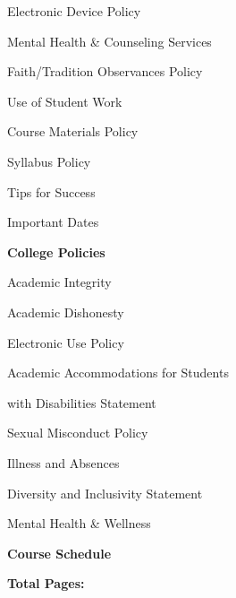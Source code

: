 \documentclass[11pt,letterpaper]{article}
\begin{document}
\begin{minipage}[t]{0.45\textwidth}
\hspace{0.3cm} Electronic Device Policy \dotfill \pageref{electronic} 
%
\end{minipage}\hfill\begin{minipage}[t]{0.45\textwidth} \par
\hspace{0.3cm} Mental Health \& Counseling Services \dotfill \pageref{mental_health} \par
\hspace{0.3cm} Faith/Tradition Observances Policy \dotfill \pageref{faith} \par
\hspace{0.3cm} Use of Student Work \dotfill \pageref{std_work} \par
\hspace{0.3cm} Course Materials Policy \dotfill \pageref{copyright} \par
\hspace{0.3cm} Syllabus Policy \dotfill \pageref{syllabus} \par
\hspace{0.3cm} Tips for Success \dotfill \pageref{tips} \par
\hspace{0.3cm} Important Dates \dotfill \pageref{imp_dates} \par
{\bfseries\color{stacred} College Policies} \dotfill \pageref{college_polc} \par
\hspace{0.3cm} Academic Integrity \dotfill \pageref{college_acadint} \par
\hspace{0.3cm} Academic Dishonesty \dotfill \pageref{college_acaddis} \par
\hspace{0.3cm} Electronic Use Policy \dotfill \pageref{college_elecuse} \par
\hspace{0.3cm} Academic Accommodations for Students \par
\hspace{0.6cm} with Disabilities Statement \dotfill \pageref{college_acadacc} \par
\hspace{0.3cm} Sexual Misconduct Policy \dotfill \pageref{college_sexmisconduct} \par
\hspace{0.3cm} Illness and Absences \dotfill \pageref{college_illnessabsences} \par
\hspace{0.3cm} Diversity and Inclusivity Statement \dotfill \pageref{college_inclusive} \par
\hspace{0.3cm} Mental Health \& Wellness \dotfill \pageref{mental_wellness} \par
{\bfseries\color{stacred} Course Schedule} \dotfill \pageref{schd} \par
\hfill {\bfseries\color{stacred} Total Pages:} \pageref*{LastPage}
\end{minipage}
\pspace
\end{document}
